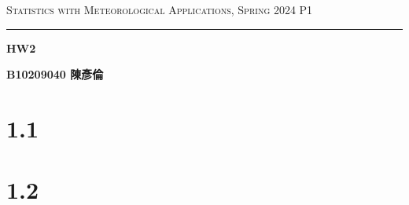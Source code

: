 \documentclass{article}
\author{B10209040 陳彥倫}
\begin{document}
\thispagestyle{empty}
\hfill {\scshape \large Statistics with Meteorological Applications, Spring 2024} \hfill {\scshape P1}
\smallskip
\hrule
\begin{CJK*}{UTF8}{bsmi}
\bigskip
\bigskip
\bigskip

\centerline{\huge \textbf {HW2}}
\bigskip
\centerline{\textbf {B10209040 陳彥倫}}

\section*{1.1}
\renewcommand{\arraystretch}{1.5} 
    \begin{table}[htbp]
        \centering
            \caption{Mean Ts for the two stations in the two periods.}
    \end{table}
\renewcommand{\arraystretch}{1.0} 

\section*{1.2}
\renewcommand{\arraystretch}{1.5} 
    \begin{table}[htbp]
        \centering
            \caption{Mean max and min Ts.}
    \end{table}
\renewcommand{\arraystretch}{1.0} 


\end{CJK*}
\end{document}
